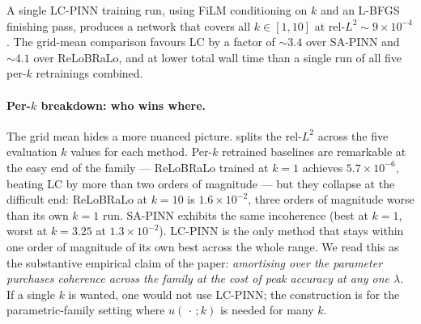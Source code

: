 A single LC-PINN training run, using FiLM conditioning
\citep{perez2018film} on $k$ and an L-BFGS finishing pass, produces
a network that
covers all $k \in [1, 10]$ at rel-$L^2 \!\sim\! 9 \times 10^{-4}$.
The grid-mean comparison favours LC by a factor of $\sim\!3.4$ over
SA-PINN and $\sim\!4.1$ over ReLoBRaLo, and at lower total wall
time than a single run of all five per-$k$ retrainings combined.

\paragraph{Per-$k$ breakdown: who wins where.}
The grid mean hides a more nuanced picture. 
splits the rel-$L^2$ across the five evaluation $k$ values for each
method. Per-$k$ retrained baselines are remarkable at the easy end
of the family --- ReLoBRaLo trained at $k\!=\!1$ achieves
$5.7\!\times\!10^{-6}$, beating LC by more than two orders of
magnitude --- but they collapse at the difficult end: ReLoBRaLo at
$k\!=\!10$ is $1.6\!\times\!10^{-2}$, three orders of magnitude
worse than its own $k\!=\!1$ run. SA-PINN exhibits the same
incoherence (best at $k\!=\!1$, worst at $k\!=\!3.25$ at
$1.3\!\times\!10^{-2}$). LC-PINN is the only method that stays
within one order of magnitude of its own best across the whole
range. We read this as the substantive empirical claim of the
paper: \emph{amortising over the parameter purchases coherence
across the family at the cost of peak accuracy at any one
$\lambda$}. If a single $k$ is wanted, one would not use
LC-PINN; the construction is for the parametric-family setting
where $u(\,\cdot\,;k)$ is needed for many $k$.


